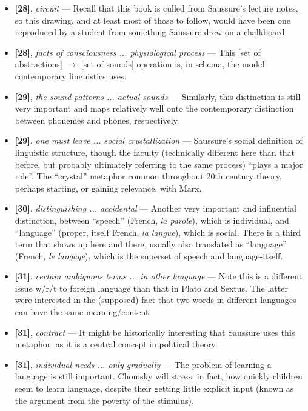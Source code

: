 \documentclass[12pt]{article}
\begin{document}
\begin{itemize}
\item \textbf{[28]}, \textit{circuit} --- Recall that this book is culled from Saussure's lecture notes, so this drawing, and at least most of those to follow, would have been one reproduced by a student from something Saussure drew on a chalkboard.

\item \textbf{[28]}, \textit{facts of consciousness ... physiological process} --- This [set of abstractions] $\rightarrow$ [set of sounds] operation is, in schema, the model contemporary linguistics uses.

\item \textbf{[29]}, \textit{the sound patterns ... actual sounds} --- Similarly, this distinction is still very important and maps relatively well onto the contemporary distinction between phonemes and phones, respectively.

\item \textbf{[29]}, \textit{one must leave ... social crystallization} --- Saussure's social definition of linguistic structure, though the faculty (technically different here than that before, but probably ultimately referring to the same process) ``plays a major role''. The ``crystal'' metaphor common throughout 20th century theory, perhaps starting, or gaining relevance, with Marx.

\item \textbf{[30]}, \textit{distinguishing ... accidental} --- Another very important and influential distinction, between ``speech'' (French, \textit{la parole}), which is individual, and ``language'' (proper, itself French, \textit{la langue}), which is social. There is a third term that shows up here and there, usually also translated as ``language'' (French, \textit{le langage}), which is the superset of speech and language-itself.

\item \textbf{[31]}, \textit{certain ambiguous terms ... in other language} --- Note this is a different issue w/r/t to foreign language than that in Plato and Sextus. The latter were interested in the (supposed) fact that two words in different languages can have the same meaning/content.

\item \textbf{[31]}, \textit{contract} --- It might be historically interesting that Saussure uses this metaphor, as it is a central concept in political theory.

\item \textbf{[31]}, \textit{individual needs ... only gradually} --- The problem of learning a language is still important. Chomsky will stress, in fact, how quickly children seem to learn language, despite their getting little explicit input (known as the argument from the poverty of the stimulus).


\end{itemize}
\end{document}
